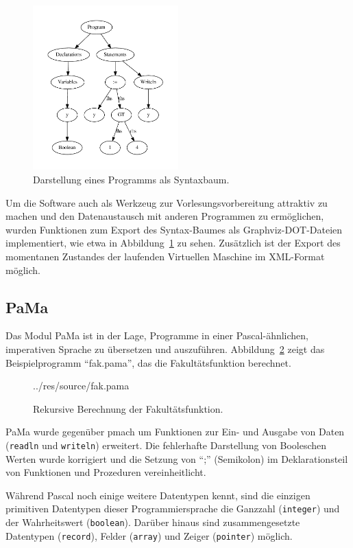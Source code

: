 \documentclass[german, a4paper, parskip, bibliography=totoc]{scrartcl}
\begin{document}
\begin{figure}[htb]
    \centering
    \includegraphics[width=0.5\textwidth]{p13_pama_dot.pdf}
    \caption{Darstellung eines Programms als Syntaxbaum.}
    \label{img_dot}
\end{figure}

Um die Software auch als Werkzeug zur Vorlesungsvorbereitung attraktiv zu
machen und den Datenaustausch mit anderen Programmen zu ermöglichen, wurden
Funktionen zum Export des Syntax-Baumes als
Graphviz-DOT-Dateien~\cite{url_graphviz} implementiert, wie etwa in
Abbildung~\ref{img_dot} zu sehen. Zusätzlich ist der Export des momentanen
Zustandes der laufenden Virtuellen Maschine im XML-Format möglich.

\subsection{PaMa}
Das Modul PaMa ist in der Lage, Programme in einer Pascal-ähnlichen,
imperativen Sprache zu übersetzen und auszuführen. Abbildung~\ref{code_pama}
zeigt das Beispielprogramm \enquote{fak.pama}, das die Fakultätsfunktion
berechnet.

\begin{figure}[htb]
     {../res/source/fak.pama}
    \caption{Rekursive Berechnung der Fakultätsfunktion.}
    \label{code_pama}
\end{figure}

PaMa wurde gegenüber pmach um Funktionen zur Ein- und Ausgabe von
Daten (\texttt{readln} und \texttt{writeln}) erweitert. Die fehlerhafte
Darstellung von Booleschen Werten wurde korrigiert und die Setzung von
\enquote{;} (Semikolon) im Deklarationsteil von Funktionen und Prozeduren
vereinheitlicht.

Während Pascal noch einige weitere Datentypen kennt, sind die einzigen
primitiven Datentypen dieser Programmiersprache die Ganzzahl (\texttt{integer})
und der Wahrheitswert (\texttt{boolean}). Darüber hinaus sind zusammengesetzte
Datentypen (\texttt{record}), Felder (\texttt{array}) und Zeiger
(\texttt{pointer}) möglich.
\end{document}
